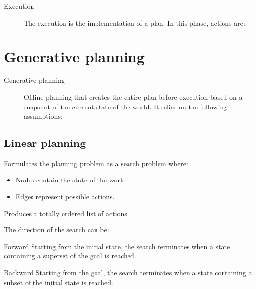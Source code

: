 \begin{description}
    \item[Execution] 
        The execution is the implementation of a plan. 
        In this phase, actions are:
\end{description}


\section{Generative planning}

\begin{description}
    \item[Generative planning] 
        Offline planning that creates the entire plan before execution based on
        a snapshot of the current state of the world.
        It relies on the following assumptions:
\end{description}


\subsection{Linear planning}
Formulates the planning problem as a search problem where:
\begin{itemize}
    \item Nodes contain the state of the world.
    \item Edges represent possible actions.
\end{itemize}
Produces a totally ordered list of actions.

The direction of the search can be:
\begin{descriptionlist}
    \item[Forward] 
        Starting from the initial state, the search terminates when a state containing a superset of the goal is reached.
    \item[Backward] 
        Starting from the goal, the search terminates when a state containing a subset of the initial state is reached.
    \end{descriptionlist}